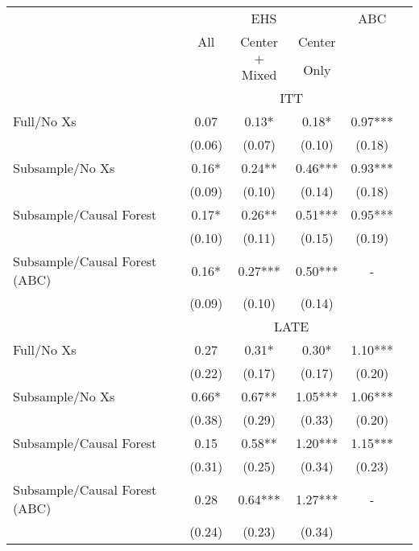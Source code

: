 \begin{tabular}{lccccc}
\toprule 
\midrule 
 & \multicolumn{3}{c}{EHS} & ABC \\
 \cmidrule(lr){2-4} 
 & All & Center & Center &  \\
 &  & $+$ Mixed & Only &  \\
\midrule 
 & \multicolumn{4}{c}{ITT} \\
 \cmidrule(lr){2-5} 
Full/No Xs & 0.07 & 0.13* & 0.18* & 0.97*** \\
 & (0.06) & (0.07) & (0.10) & (0.18) \\
Subsample/No Xs & 0.16* & 0.24** & 0.46*** & 0.93*** \\
 & (0.09) & (0.10) & (0.14) & (0.18) \\
Subsample/Causal Forest & 0.17* & 0.26** & 0.51*** & 0.95*** \\
 & (0.10) & (0.11) & (0.15) & (0.19) \\
Subsample/Causal Forest (ABC) & 0.16* & 0.27*** & 0.50*** & - \\
 & (0.09) & (0.10) & (0.14) \\
\midrule 
 & \multicolumn{4}{c}{LATE} \\
 \cmidrule(lr){2-5} 
Full/No Xs & 0.27 & 0.31* & 0.30* & 1.10*** \\
 & (0.22) & (0.17) & (0.17) & (0.20) \\
Subsample/No Xs & 0.66* & 0.67** & 1.05*** & 1.06*** \\
 & (0.38) & (0.29) & (0.33) & (0.20) \\
Subsample/Causal Forest & 0.15 & 0.58** & 1.20*** & 1.15*** \\
 & (0.31) & (0.25) & (0.34) & (0.23) \\
Subsample/Causal Forest (ABC) & 0.28 & 0.64*** & 1.27*** & - \\
 & (0.24) & (0.23) & (0.34) \\
\midrule 
\bottomrule 
\end{tabular}

